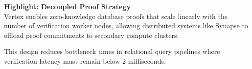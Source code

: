 \begin{tcolorbox}
  \textbf{Highlight: Decoupled Proof Strategy} \\
  Vertex enables zero-knowledge database proofs that scale linearly with the number of verification worker nodes, allowing distributed systems like Synapse to offload proof commitments to secondary compute clusters.
  
  This design reduces bottleneck times in relational query pipelines where verification latency must remain below 2 milliseconds.
\end{tcolorbox}
